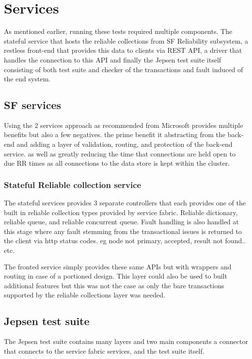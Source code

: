\documentclass[a4paper,10pt,titlepage]{report}
\begin{document}
    \section{Services}
    As mentioned earlier, running these tests required multiple components. The stateful service that hosts the reliable collections from SF Reliability subsystem, a restless front-end that provides this data to clients via REST API, a driver that handles the connection to this API and finally the Jepsen test suite itself consisting of both test suite and checker of the transactions and fault induced of the end system.

    \subsection{SF services}
    Using the 2 services approach as recommended from Microsoft provides multiple benefits but also a few negatives. the prime benefit it abstracting from the back-end and adding a layer of validation, routing, and protection of the back-end service. as well as greatly reducing the time that connections are held open to due RR times as all connections to the data store is kept within the cluster.

    \subsubsection{Stateful Reliable collection service}

    The stateful services provides 3 separate controllers that each provides one of the built in reliable collection types provided by service fabric. Reliable dictionary, reliable queue, and reliable concurrent queue. Fault handling is also handled at this stage where any fault stemming from the transactional issues is returned to the client via http status codes\cite{wikihttpstatuscodes}. eg node not primary, accepted, result not found.. etc.

    The fronted service simply provides these same APIs but with wrappers and routing in case of a portioned design. This layer could also be used to built additional features but this was not the case as only the bare transactions supported by the reliable collections layer was needed.

    \subsection{Jepsen test suite}
    The Jepsen test suite contains many layers and two main components a connector that connects to the service fabric services, and the test suite itself.
\end{document}
